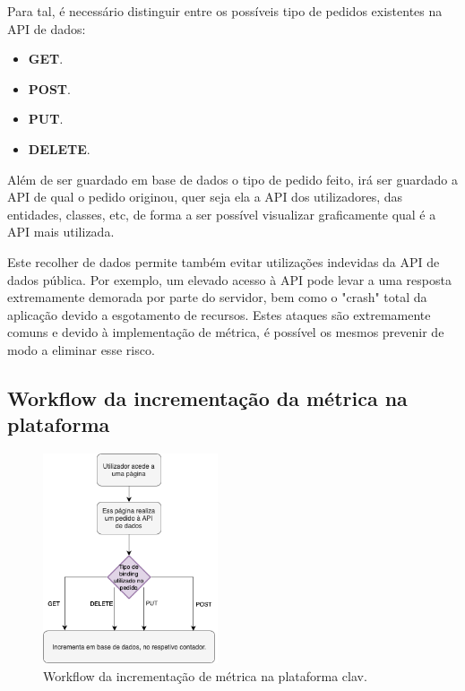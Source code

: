 Para tal, é necessário distinguir entre os possíveis tipo de pedidos existentes na API de dados: 
\vspace{-3mm}
\begin{itemize}
    \item \textbf{GET}.
    \vspace{-1.5mm}
    \item \textbf{POST}.
    \vspace{-1.5mm}
    \item \textbf{PUT}.
    \vspace{-1.5mm}
    \item \textbf{DELETE}.
\end{itemize}

\vspace{-1mm}
Além de ser guardado em base de dados o tipo de pedido feito, irá ser guardado a API de qual o pedido originou, quer seja ela a API dos utilizadores, das entidades, classes, etc, de forma a ser possível visualizar graficamente qual é a API mais utilizada.

Este recolher de dados permite também evitar utilizações indevidas da API de dados pública. Por exemplo, um elevado acesso à API pode levar a uma resposta extremamente demorada por parte do servidor, bem como o "crash" total da aplicação devido a esgotamento de recursos. Estes ataques são extremamente comuns e devido à implementação de métrica, é possível os mesmos prevenir de modo a eliminar esse risco.

\vspace{-6mm}
\subsection{Workflow da incrementação da métrica na plataforma}
\vspace{-5mm}
\begin{figure}[h!]
    \centering
    \includegraphics[width=0.46\textwidth]{img/diagramas/gestaometrica/Metrica.png}
    \caption{Workflow da incrementação de métrica na plataforma \gls{clav}.}
    \label{fig:flow_Metrica}
\end{figure}